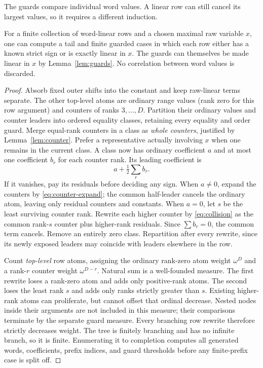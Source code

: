 \documentclass[11pt]{article}
\begin{document}
The guards compare individual word values. A linear row can still cancel
its largest values, so it requires a different induction.

\begin{lemma}\label{lem:row}
For a finite collection of word-linear rows and a chosen maximal raw
variable $x$, one can compute a tail and finite guarded cases in which
each row either has a known strict sign or is exactly linear in $x$.
The guards can themselves be made linear in $x$ by
Lemma~\ref{lem:guards}. No correlation between word values is discarded.
\end{lemma}
\begin{proof}
Absorb fixed outer shifts into the constant and keep raw-linear terms
separate. The other top-level atoms are ordinary range values (rank zero
for this row argument) and counters of ranks $3,\ldots,D$. Partition their
ordinary values and counter leaders into ordered equality classes, retaining
every equality and order guard. Merge equal-rank counters in a class as
\emph{whole counters}, justified by Lemma~\ref{lem:counter}. Prefer a
representative actually involving $x$ when one remains in the current
class. A class now has ordinary coefficient $a$ and at most one coefficient
$b_r$ for each counter rank. Its leading coefficient is
\[
 a+\tfrac12\sum_r b_r.
\]
If it vanishes, pay its residuals before deciding any sign. When $a\ne0$,
expand the counters by \eqref{eq:counter-expand}; the common half-leader
cancels the ordinary atom, leaving only residual counters and constants.
When $a=0$, let $s$ be the least surviving counter rank. Rewrite each
higher counter by \eqref{eq:collision} as the common rank-$s$ counter plus
higher-rank residuals. Since $\sum b_r=0$, the common term cancels. Remove
an entirely zero class. Repartition after every rewrite, since its newly
exposed leaders may coincide with leaders elsewhere in the row.

Count \emph{top-level} row atoms, assigning the ordinary rank-zero atom
weight $\omega^D$ and a rank-$r$ counter weight $\omega^{D-r}$.
Natural sum is a well-founded measure. The first rewrite loses a rank-zero
atom and adds only positive-rank atoms. The second loses the least rank
$s$ and adds only ranks strictly greater than $s$. Existing higher-rank
atoms can proliferate, but cannot offset that ordinal decrease. Nested
nodes inside their arguments are not included in this measure; their
comparisons terminate by the separate guard measure. Every branching row
rewrite therefore strictly decreases weight. The tree is finitely
branching and has no infinite branch, so it is finite. Enumerating it to
completion computes all generated words, coefficients, prefix indices,
and guard thresholds before any finite-prefix case is split off.


\end{proof}
\end{document}
